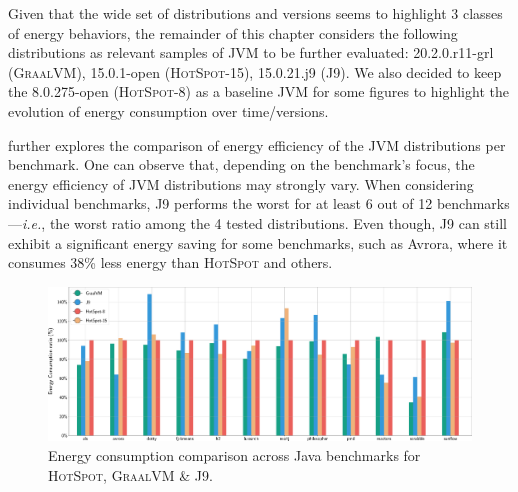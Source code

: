 

Given that the wide set of distributions and versions seems to highlight 3 classes of energy behaviors, the remainder of this chapter considers the following distributions as relevant samples of JVM to be further evaluated: \textsf{20.2.0.r11-grl} (\textsc{GraalVM}), \textsf{15.0.1-open} (\textsc{HotSpot-15}), \textsf{15.0.21.j9} (\textsc{J9}).
We also decided to keep the \textsf{8.0.275-open} (\textsc{HotSpot-8}) as a baseline JVM for some figures to highlight the evolution of energy consumption over time/versions.

 further explores the comparison of energy efficiency of the JVM distributions per benchmark.
One can observe that, depending on the benchmark's focus, the energy efficiency of JVM distributions may strongly vary.
When considering individual benchmarks, \textsc{J9} performs the worst for at least 6 out of 12 benchmarks---\emph{i.e.}, the worst ratio among the 4 tested distributions.
Even though, \textsc{J9} can still exhibit a significant energy saving for some benchmarks, such as \textsf{Avrora}, where it consumes 38\% less energy than \textsc{HotSpot} and others.

\begin{figure}%
    \includegraphics[width=.87\linewidth]{imgs/bar_plot_all_basedon8}
    \centering
    \captionsetup{justification=centering}
    \caption{Energy consumption comparison across Java benchmarks for \textsc{HotSpot}, \textsc{GraalVM} \& \textsc{J9}.}
    \label{fig:all_benchs}
\end{figure}

